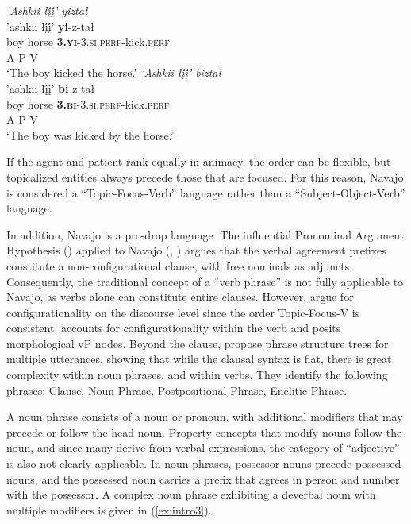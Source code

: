 \ea\label{ex:intro2}
    \ea
    \textit{’Ashkii łį́į́’ yiztał}\\
    \glll \textup{’ashkii} \textup{łį́į́’} \textup{\textbf{yi}-z-tał}\\
	boy horse \textbf{\textsc{3.yi}}-\textsc{3.si.perf}-kick.\textsc{perf}\\
    A P V\\
    \glt `The boy kicked the horse.' %
    \ex
    \textit{’Ashkii łį́į́’ biztał}\\
    \glll \textup{’ashkii} \textup{łį́į́’} \textup{\textbf{bi}-z-tał}\\
    boy horse \textbf{\textsc{3.bi}}-\textsc{3.si.perf}-kick.\textsc{perf}\\
    A P V\\
    \glt `The boy was kicked by the horse.'
    \z
\z
    
If the agent and patient rank equally in animacy, the order can be flexible, but topicalized entities always precede those that are focused. For this reason, Navajo is considered a ``Topic-Focus-Verb'' language rather than a ``Subject-Object-Verb'' language.

In addition, Navajo is a pro-drop language. The influential Pronominal Argument Hypothesis (\cite{SandovalJelinek:1989ke}) applied to Navajo (\cite{Speas:1990kf}, \cite{Hale:2006wh}) argues that the verbal agreement prefixes constitute a non-configurational clause, with free nominals as adjuncts. Consequently, the traditional concept of a ``verb phrase'' is not fully applicable to Navajo, as verbs alone can constitute entire clauses. However, \citet{Willie:1995zc} argue for configurationality on the discourse level since the order Topic-Focus-V is consistent. \citet{Hale:2001aq} accounts for configurationality within the verb and posits morphological vP nodes. Beyond the clause, \citet{Hale:1977li} propose phrase structure trees for multiple utterances, showing that while the clausal syntax is flat, there is great complexity within noun phrases, and within verbs. They identify the following phrases: Clause, Noun Phrase, Postpositional Phrase, Enclitic Phrase. 

A noun phrase consists of a noun or pronoun, with additional modifiers that may precede or follow the head noun. Property concepts that modify nouns follow the noun, and since many derive from verbal expressions, the category of ``adjective'' is also not clearly applicable. In noun phrases, possessor nouns precede possessed nouns, and the possessed noun carries a prefix that agrees in person and number with the possessor. A complex noun phrase exhibiting a deverbal noun with multiple modifiers is given in (\ref{ex:intro3}).

